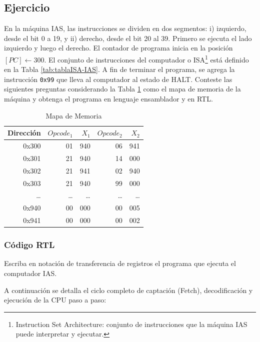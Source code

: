 \documentclass{article}
\begin{document}
\newpage

\subsection{Ejercicio}
\label{sec:orgb98224b}

En la máquina IAS, las instrucciones se dividen en dos segmentos:
i) izquierdo, desde el bit 0 a 19, y ii) derecho, desde el bit 20 al 39. Primero
se ejecuta el lado izquierdo y luego el derecho. El
contador de programa inicia en la posición \([PC] \leftarrow 300\). El conjunto de
instrucciones del computador o ISA\footnote{Instruction Set Architecture: conjunto de instrucciones que la máquina IAS puede interpretar y ejecutar.} está definido en la Tabla
\ref{tab:tablaISA-IAS}. A fin de terminar el programa, se agrega la
instrucción \texttt{0x99} que lleva al computador al estado de HALT. Conteste las
siguientes preguntas considerando la Tabla \ref{tab:org2f87291} como el
mapa de memoria de la máquina y obtenga el programa en lenguaje ensamblador y en
RTL.

\begin{table}[htbp]
\caption{\label{tab:org2f87291}Mapa de Memoria}
\centering
\begin{tabular}{rrrrr}
\hline
Dirección & \(Opcode_1\) & \(X_1\) & \(Opcode_2\) & \(X_2\)\\[0pt]
\hline
0x300 & 01 & 940 & 06 & 941\\[0pt]
0x301 & 21 & 940 & 14 & 000\\[0pt]
0x302 & 21 & 941 & 02 & 940\\[0pt]
0x303 & 21 & 940 & 99 & 000\\[0pt]
\ldots{} & \ldots{} & \ldots{} & \ldots{} & \ldots{}\\[0pt]
0x940 & 00 & 000 & 00 & 005\\[0pt]
0x941 & 00 & 000 & 00 & 002\\[0pt]
\hline
\end{tabular}
\end{table}

\subsubsection{Código RTL}
\label{sec:orgc6e8743}
Escriba en notación de transferencia de registros el programa que ejecuta el computador IAS.

A continuación se detalla el ciclo completo de captación (Fetch), decodificación y ejecución de la CPU paso a paso:
\end{document}
